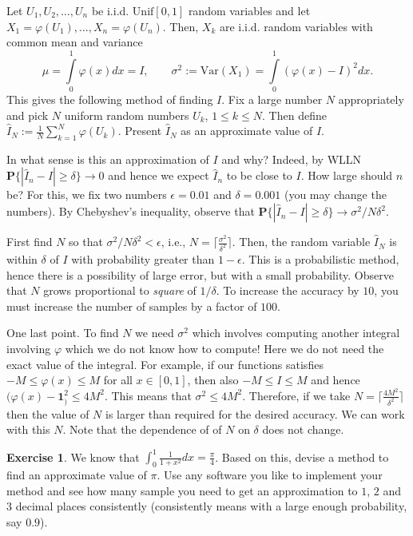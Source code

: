 \documentclass[preprint,  11pt]{amsart}
\def\I#1{\mathbf{1}_{#1}}
\theoremstyle{plain} %
\theoremstyle{definition} %
\newtheorem{exercise}[theorem]{Exercise}
\begin{document}
Let $U_{1},U_{2},\ldots ,U_{n}$ be i.i.d. $\mbox{Unif}[0,1]$ random variables and let $X_{1}=\varphi(U_{1}),\ldots ,X_{n}=\varphi(U_{n})$. Then, $X_{k}$ are i.i.d. random variables with common mean and variance
$$
\mu=\int\limits_{0}^{1}\varphi(x)dx = I, \qquad {\sigma}^{2}:=\mbox{Var}(X_{1})=\int\limits_{0}^{1}(\varphi(x)-I)^{2}dx.
$$
This gives the following method of finding $I$. Fix a large number $N$ appropriately and pick $N$ uniform random numbers $U_{k}$, $1\le k\le N$. Then define $\hat{I}_{N}:=\frac{1}{N}\sum_{k=1}^{N}\varphi(U_{k})$. Present $\hat{I}_{N}$ as an approximate value of $I$.

In what sense is this an approximation of $I$ and why? Indeed, by WLLN $\mathbf{P}\{|\hat{I}_{n}-I|\ge \delta \}\rightarrow 0$ and hence we expect $\hat{I}_{n}$ to be close to $I$. How large should $n$ be? For this, we fix two numbers $\epsilon=0.01$ and $\delta=0.001$ (you may change the numbers). By Chebyshev's inequality, observe that $\mathbf{P}\{|\hat{I}_{n}-I|\ge \delta \}\rightarrow {\sigma}^{2}/N\delta^{2}$.

 First find $N$ so that ${\sigma}^{2}/N\delta^{2}<\epsilon$, i.e., $N=\lceil \frac{{\sigma}^{2}}{\delta^{2}}\rceil$. Then, the random variable $\hat{I}_{N}$ is within $\delta$ of $I$ with probability greater than $1-\epsilon$. This is a probabilistic method, hence there is a possibility of large error, but with a small probability. Observe that $N$ grows proportional to {\em square} of $1/\delta$. To increase the accuracy by $10$, you must increase the number of samples by a factor of $100$. 
 
 One last point. To find $N$ we need ${\sigma}^{2}$ which involves computing another integral involving $\varphi$ which we do not know how to compute!  Here we do not need the exact value of the integral. For example,  if our functions satisfies $-M\le \varphi(x)\le M$ for all $x\in [0,1]$, then also $-M\le I\le M$ and hence $(\varphi(x)-\I)^{2}\le 4M^{2}$. This means that ${\sigma}^{2}\le 4M^{2}$. Therefore, if we take $N=\lceil \frac{4M^{2}}{\delta^{2}}\rceil$ then the value of $N$ is larger than required for the desired accuracy. We can work with this $N$. Note that the dependence of  of $N$ on $\delta$ does not change.
 
\begin{exercise} We know that $\int_{0}^{1}\frac{1}{1+x^{2}}dx=\frac{\pi}{4}$. Based on this, devise a method to find an approximate value of $\pi$. Use any software you like to implement your method and see how many sample you need to get an approximation to $1$, $2$ and $3$ decimal places consistently (consistently means with a large enough probability, say $0.9$). 
\end{exercise} 
 
\end{document}
